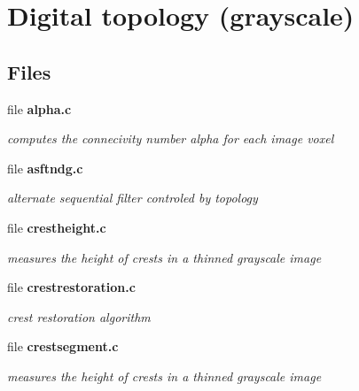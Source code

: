 \section{Digital topology (grayscale)}
\label{group__topogray}
\subsection*{Files}
\begin{DoxyCompactItemize}
\item 
file {\bf alpha.c}


\begin{DoxyCompactList}\small\item\em computes the connecivity number alpha for each image voxel \item\end{DoxyCompactList}

\item 
file {\bf asftndg.c}


\begin{DoxyCompactList}\small\item\em alternate sequential filter controled by topology \item\end{DoxyCompactList}

\item 
file {\bf crestheight.c}


\begin{DoxyCompactList}\small\item\em measures the height of crests in a thinned grayscale image \item\end{DoxyCompactList}

\item 
file {\bf crestrestoration.c}


\begin{DoxyCompactList}\small\item\em crest restoration algorithm \item\end{DoxyCompactList}

\item 
file {\bf crestsegment.c}


\begin{DoxyCompactList}\small\item\em measures the height of crests in a thinned grayscale image \item\end{DoxyCompactList}


\end{DoxyCompactItemize}
